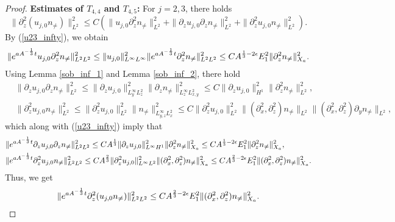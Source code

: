 \documentclass[12pt, reqno]{amsart}
\numberwithin{equation}{section}
\begin{document}
\begin{proof}
		\noindent\textbf{Estimates of $T_{4,4}$ and $T_{4,5}$:}
		For $j=2,3$, there holds $$\|
		\partial_z^2(u_{j,0}n_{\neq})\|_{L^2}^2
		\leq C(
		\|u_{j,0}\partial_z^2n_{\neq}\|^2_{L^2}
		+\|\partial_zu_{j,0}\partial_zn_{\neq}\|^2_{L^2}
		+\|\partial_z^2u_{j,0}n_{\neq}\|^2_{L^2}).$$
		By (\ref{u23_infty}), we obtain 
		\begin{equation*}
			\begin{aligned}
				\|{\rm e}^{aA^{-\frac{1}{3}}t}u_{j,0}\partial_z^2n_{\neq}\|^2_{L^2L^2}
				\leq \|u_{j,0}\|^2_{L^{\infty}L^{\infty}}\|{\rm e}^{aA^{-\frac{1}{3}}t}\partial_z^2n_{\neq}\|^2_{L^2L^2}
				\leq CA^{\frac13-2\epsilon}E_1^2
				\|\partial_z^2n_{\neq}\|^2_{X_a}.
			\end{aligned}
		\end{equation*}
		Using Lemma \ref{sob_inf_1} and Lemma \ref{sob_inf_2}, there hold
		\begin{equation*}
			\begin{aligned}						&\|\partial_zu_{j,0}\partial_zn_{\neq}\|^2_{L^2}\leq 
				\|\partial_zu_{j,0}\|^2_{L^{\infty}_yL^2_z}
				\|\partial_zn_{\neq}\|^2_{L^{\infty}_{z}L^2_{x,y}}
				\leq C\|\partial_zu_{j,0}\|^2_{H^1}
				\|\partial_z^2n_{\neq}\|_{L^2}^2,\\
				&\|\partial_z^2u_{j,0}n_{\neq}\|^2_{L^2}\leq 
				\|\partial_z^2u_{j,0}\|^2_{L^2}
				\|n_{\neq}\|^2_{L^{\infty}_{y,z}L^2_{x}}
				\leq C\|\partial_z^2u_{j,0}\|^2_{L^2}
				\|(\partial_x^2,\partial_z^2)n_{\neq}\|_{L^2}
				\|(\partial_x^2,\partial_z^2)\partial_yn_{\neq}\|_{L^2},
			\end{aligned}
		\end{equation*}
		which along with  (\ref{u23_infty}) imply that 
		\begin{equation*}
			\begin{aligned}
				&\|{\rm e}^{aA^{-\frac{1}{3}}t}\partial_zu_{j,0}
				\partial_zn_{\neq}\|^2_{L^2L^2}
				\leq CA^{\frac13}\|\partial_zu_{j,0}\|^2_{L^{\infty}H^1}
				\|\partial_z^2n_{\neq}\|^2_{X_a}\leq CA^{\frac13-2\epsilon}E_1^2
				\|\partial_z^2n_{\neq}\|^2_{X_a},\\
				&\|{\rm e}^{aA^{-\frac{1}{3}}t}\partial_z^2u_{j,0}
				n_{\neq}\|^2_{L^2L^2}
				\leq CA^{\frac23}\|\partial_z^2u_{j,0}\|^2_{L^{\infty}L^2}
				\|(\partial_x^2,\partial_z^2)n_{\neq}\|^2_{X_a}\leq CA^{\frac23-2\epsilon}E_1^2
				\|(\partial_x^2,\partial_z^2)n_{\neq}\|^2_{X_a}.
			\end{aligned}
		\end{equation*}
		Thus, we get 
		\begin{equation}\label{temp1_4}
			\begin{aligned}
				\|{\rm e}^{aA^{-\frac{1}{3}}t}\partial_z^2(u_{j,0}
				n_{\neq})\|_{L^2L^2}^2\leq 
				CA^{\frac23-2\epsilon}E_1^2\|(\partial_x^2,\partial_z^2)n_{\neq}\|^2_{X_a}.
			\end{aligned}
		\end{equation}
		

\end{proof}
\end{document}
